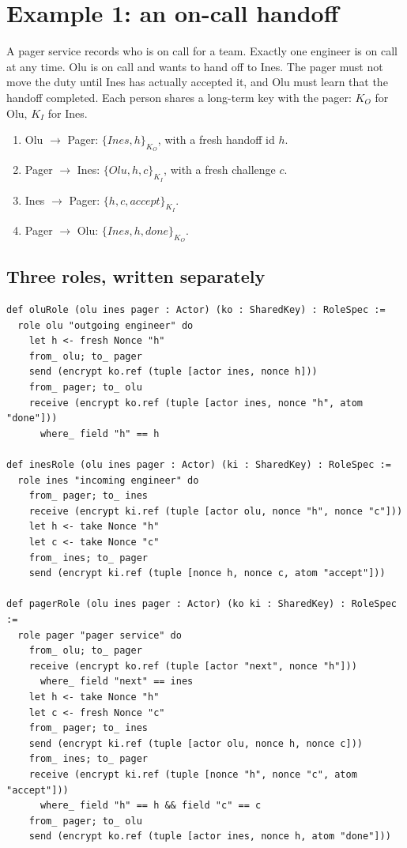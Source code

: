\section{Example 1: an on-call handoff}

A pager service records who is on call for a team. Exactly one engineer is on
call at any time. Olu is on call and wants to hand off to Ines. The pager must
not move the duty until Ines has actually accepted it, and Olu must learn that
the handoff completed. Each person shares a long-term key with the pager:
$K_O$ for Olu, $K_I$ for Ines.

\begin{enumerate}
  \item Olu $\to$ Pager: $\{\mathit{Ines}, h\}_{K_O}$, with a fresh handoff id $h$.
  \item Pager $\to$ Ines: $\{\mathit{Olu}, h, c\}_{K_I}$, with a fresh challenge $c$.
  \item Ines $\to$ Pager: $\{h, c, \mathit{accept}\}_{K_I}$.
  \item Pager $\to$ Olu: $\{\mathit{Ines}, h, \mathit{done}\}_{K_O}$.
\end{enumerate}

\subsection{Three roles, written separately}

\begin{lstlisting}
def oluRole (olu ines pager : Actor) (ko : SharedKey) : RoleSpec :=
  role olu "outgoing engineer" do
    let h <- fresh Nonce "h"
    from_ olu; to_ pager
    send (encrypt ko.ref (tuple [actor ines, nonce h]))
    from_ pager; to_ olu
    receive (encrypt ko.ref (tuple [actor ines, nonce "h", atom "done"]))
      where_ field "h" == h

def inesRole (olu ines pager : Actor) (ki : SharedKey) : RoleSpec :=
  role ines "incoming engineer" do
    from_ pager; to_ ines
    receive (encrypt ki.ref (tuple [actor olu, nonce "h", nonce "c"]))
    let h <- take Nonce "h"
    let c <- take Nonce "c"
    from_ ines; to_ pager
    send (encrypt ki.ref (tuple [nonce h, nonce c, atom "accept"]))

def pagerRole (olu ines pager : Actor) (ko ki : SharedKey) : RoleSpec :=
  role pager "pager service" do
    from_ olu; to_ pager
    receive (encrypt ko.ref (tuple [actor "next", nonce "h"]))
      where_ field "next" == ines
    let h <- take Nonce "h"
    let c <- fresh Nonce "c"
    from_ pager; to_ ines
    send (encrypt ki.ref (tuple [actor olu, nonce h, nonce c]))
    from_ ines; to_ pager
    receive (encrypt ki.ref (tuple [nonce "h", nonce "c", atom "accept"]))
      where_ field "h" == h && field "c" == c
    from_ pager; to_ olu
    send (encrypt ko.ref (tuple [actor ines, nonce h, atom "done"]))
\end{lstlisting}

